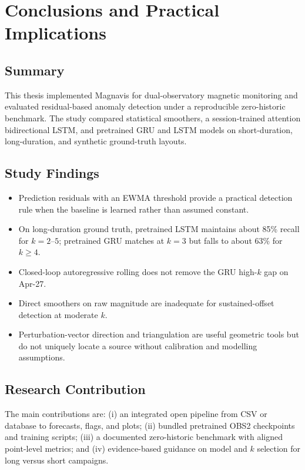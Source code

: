 \chapter{Conclusions and Practical Implications}\doublespacing
\label{Chapter6}

\section{Summary}
This thesis implemented Magnavis for dual-observatory magnetic monitoring and evaluated residual-based anomaly detection under a reproducible zero-historic benchmark. The study compared statistical smoothers, a session-trained attention bidirectional LSTM, and pretrained GRU and LSTM models on short-duration, long-duration, and synthetic ground-truth layouts.

\section{Study Findings}
\begin{itemize}
    \item Prediction residuals with an EWMA threshold provide a practical detection rule when the baseline is learned rather than assumed constant.
    \item On long-duration ground truth, pretrained LSTM maintains about 85\% recall for $k=2$--$5$; pretrained GRU matches at $k=3$ but falls to about 63\% for $k \ge 4$.
    \item Closed-loop autoregressive rolling does not remove the GRU high-$k$ gap on Apr-27.
    \item Direct smoothers on raw magnitude are inadequate for sustained-offset detection at moderate $k$.
    \item Perturbation-vector direction and triangulation are useful geometric tools but do not uniquely locate a source without calibration and modelling assumptions.
\end{itemize}

\section{Research Contribution}
The main contributions are: (i) an integrated open pipeline from CSV or database to forecasts, flags, and plots; (ii) bundled pretrained OBS2 checkpoints and training scripts; (iii) a documented zero-historic benchmark with aligned point-level metrics; and (iv) evidence-based guidance on model and $k$ selection for long versus short campaigns.

